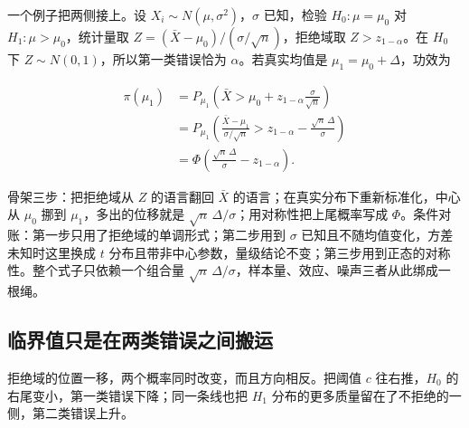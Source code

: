 一个例子把两侧接上。设 \(X_i\sim N(\mu,\sigma^2)\)，\(\sigma\) 已知，检验 \(H_0:\mu=\mu_0\) 对 \(H_1:\mu>\mu_0\)，统计量取 \(Z=(\bar X-\mu_0)/(\sigma/\sqrt n)\)，拒绝域取 \(Z>z_{1-\alpha}\)。在 \(H_0\) 下 \(Z\sim N(0,1)\)，所以第一类错误恰为 \(\alpha\)。若真实均值是 \(\mu_1=\mu_0+\Delta\)，功效为

\[
\begin{aligned}
\pi(\mu_1)
&=P_{\mu_1}\!\left(\bar X>\mu_0+z_{1-\alpha}\frac{\sigma}{\sqrt n}\right)\\
&=P_{\mu_1}\!\left(\frac{\bar X-\mu_1}{\sigma/\sqrt n}>z_{1-\alpha}-\frac{\sqrt n\,\Delta}{\sigma}\right)\\
&=\Phi\!\left(\frac{\sqrt n\,\Delta}{\sigma}-z_{1-\alpha}\right).
\end{aligned}
\]

骨架三步：把拒绝域从 \(Z\) 的语言翻回 \(\bar X\) 的语言；在真实分布下重新标准化，中心从 \(\mu_0\) 挪到 \(\mu_1\)，多出的位移就是 \(\sqrt n\,\Delta/\sigma\)；用对称性把上尾概率写成 \(\Phi\)。条件对账：第一步只用了拒绝域的单调形式；第二步用到 \(\sigma\) 已知且不随均值变化，方差未知时这里换成 \(t\) 分布且带非中心参数，量级结论不变；第三步用到正态的对称性。整个式子只依赖一个组合量 \(\sqrt n\,\Delta/\sigma\)，样本量、效应、噪声三者从此绑成一根绳。

\subsection{临界值只是在两类错误之间搬运}

拒绝域的位置一移，两个概率同时改变，而且方向相反。把阈值 \(c\) 往右推，\(H_0\) 的右尾变小，第一类错误下降；同一条线也把 \(H_1\) 分布的更多质量留在了不拒绝的一侧，第二类错误上升。

